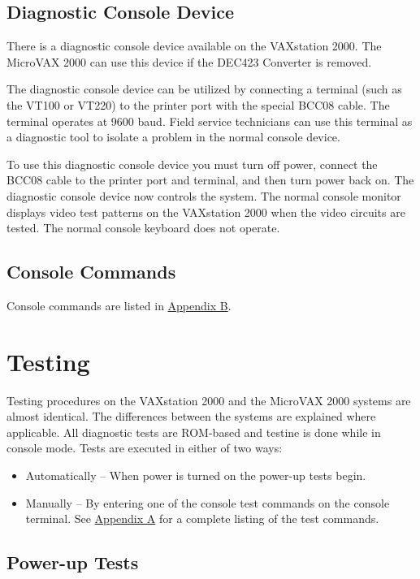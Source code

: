 \subsection{Diagnostic Console Device}

There is a diagnostic console device available on the VAXstation 2000. The
MicroVAX 2000 can use this device if the DEC423 Converter is removed.

The diagnostic console device can be utilized by connecting a terminal (such
as the VT100 or VT220) to the printer port with the special BCC08 cable.
The terminal operates at 9600 baud. Field service technicians can use this
terminal as a diagnostic tool to isolate a problem in the normal console
device.

To use this diagnostic console device you must turn off power, connect the
BCC08 cable to the printer port and terminal, and then turn power back on.
The diagnostic console device now controls the system. The normal console
monitor displays video test patterns on the VAXstation 2000 when the video
circuits are tested. The normal console keyboard does not operate.

\subsection{Console Commands}

Console commands are listed in \hyperlink{appendix.b}{Appendix B}.
\newpage
\section{Testing}

Testing procedures on the VAXstation 2000 and the MicroVAX 2000 systems
are almost identical. The differences between the systems are explained
where applicable. All diagnostic tests are ROM-based and testine is done
while in console mode. Tests are executed in either of two ways:

\begin{itemize}
\item Automatically -- When power is turned on the power-up tests begin.
\item Manually -- By entering one of the console test commands on the 
console terminal. See \hyperlink{appendix.a}{Appendix A} for a complete listing of the test commands.
\end{itemize}

\subsection{Power-up Tests}


